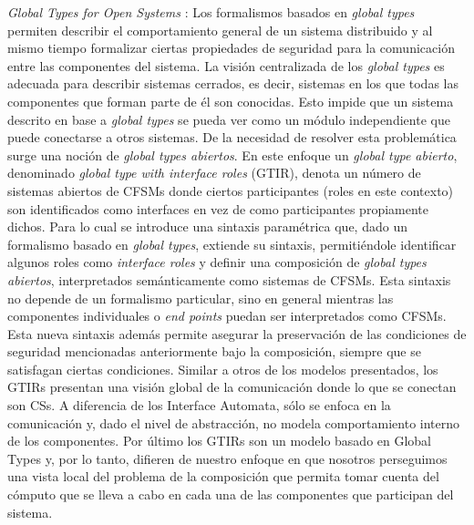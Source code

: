 \emph{Global Types for Open Systems} \cite{barbanera:eptcs279}: Los formalismos basados en \emph{global types} permiten describir el comportamiento general de un sistema distribuido y al mismo tiempo formalizar ciertas propiedades de seguridad para la comunicación entre las componentes del sistema. La visión centralizada de los \emph{global types} es adecuada para describir sistemas cerrados, es decir, sistemas en los que todas las componentes que forman parte de él son conocidas. Esto impide que un sistema descrito en base a \emph{global types} se pueda ver como un módulo independiente que puede conectarse a otros sistemas. De la necesidad de resolver esta problemática surge una noción de \emph{global types abiertos}. En este enfoque un \emph{global type abierto}, denominado \emph{global type with interface roles} (GTIR), denota un número de sistemas abiertos de CFSMs donde ciertos participantes (roles en este contexto) son identificados como interfaces en vez de como participantes propiamente dichos. Para lo cual se introduce una sintaxis paramétrica que, dado un formalismo basado en \emph{global types}, extiende su sintaxis, permitiéndole identificar algunos roles como \emph{interface roles} y definir una composición de \emph{global types abiertos}, interpretados semánticamente como sistemas de CFSMs. Esta sintaxis no depende de un formalismo particular, sino en general mientras las componentes individuales o \emph{end points} puedan ser interpretados como CFSMs. Esta nueva sintaxis además permite asegurar la preservación de las condiciones de seguridad mencionadas anteriormente bajo la composición, siempre que se satisfagan ciertas condiciones. Similar a otros de los modelos presentados, los GTIRs presentan una visión global de la comunicación donde lo que se conectan son CSs. A diferencia de los Interface Automata, sólo se enfoca en la comunicación y, dado el nivel de abstracción, no modela comportamiento interno de los componentes. Por último los GTIRs son un modelo basado en Global Types y, por lo tanto, difieren de nuestro enfoque en que nosotros perseguimos una vista local del problema de la composición que permita tomar cuenta del cómputo que se lleva a cabo en cada una de las componentes que participan del sistema. \\

